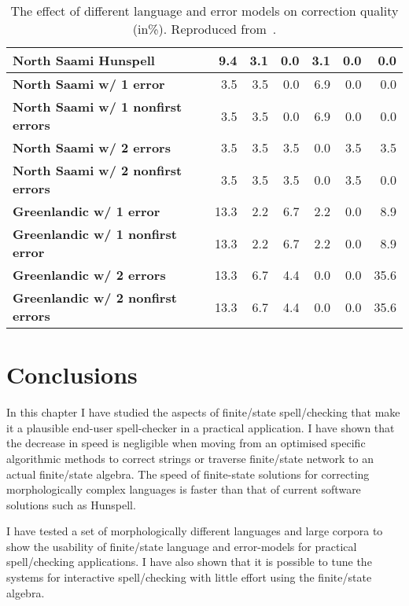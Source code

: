 \documentclass[officiallayout]{unihelcompling}
\begin{document}
\begin{table}
\begin{tabular}{|l|r|r|r|r|r|r|}
        \hline
        \bf North Saami Hunspell & 9.4 & 3.1 & 0.0 & 3.1 & 0.0 & 0.0 \\
        \hline
        \bf North Saami w/ 1 error & 3.5 & 3.5 & 0.0 & 6.9 & 0.0 & 0.0 \\
        \bf North Saami w/ 1 nonfirst errors & 3.5 & 3.5 & 0.0 & 6.9 & 0.0 & 0.0\\
        \bf North Saami w/ 2 errors & 3.5 & 3.5 & 3.5 & 0.0 & 3.5 & 3.5 \\
        \bf North Saami w/ 2 nonfirst errors & 3.5 & 3.5 & 3.5 & 0.0 & 3.5 & 0.0\\
        \hline
          \bf Greenlandic w/ 1 error & 13.3 & 2.2 & 6.7 & 2.2 & 0.0 & 8.9 \\
 \bf Greenlandic w/ 1 nonfirst error & 13.3 & 2.2 & 6.7 & 2.2 & 0.0 & 8.9 \\
         \bf Greenlandic w/ 2 errors & 13.3 & 6.7 & 4.4 & 0.0 & 0.0 & 35.6 \\
\bf Greenlandic w/ 2 nonfirst errors & 13.3 & 6.7 & 4.4 & 0.0 & 0.0 & 35.6 \\
        \hline
    \end{tabular}

    \caption{The effect of different language and error models on correction 
        quality (in\%). Reproduced from~.
    \label{table:nejlt-2013-repro}}
\end{table}

\section{Conclusions}

In this chapter I have studied the aspects of finite\-/state spell\-/checking
that make it a plausible end-user spell-checker in a practical application. I
have shown that the decrease in speed is negligible when moving from an
optimised specific algorithmic methods to correct strings or traverse
finite\-/state network to an actual finite\-/state algebra. The
speed of finite-state solutions for correcting morphologically complex
languages is faster than that of current software solutions such as Hunspell.

I have tested a set of morphologically different languages and large corpora to
show the usability of finite\-/state language and error-models for practical
spell\-/checking applications. I have also shown that it is possible to tune
the systems for interactive spell\-/checking with little effort using the
finite\-/state algebra.
\end{document}
